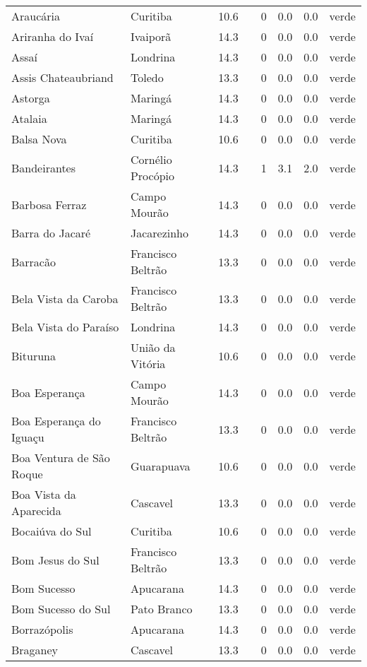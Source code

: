 \begin{longtable}{l|lllllll}
  Araucária & Curitiba & 10.6 &  & 0 & 0.0 & 0.0 & verde \\ 
  Ariranha do Ivaí & Ivaiporã & 14.3 &  & 0 & 0.0 & 0.0 & verde \\ 
  Assaí & Londrina & 14.3 &  & 0 & 0.0 & 0.0 & verde \\ 
  Assis Chateaubriand & Toledo & 13.3 &  & 0 & 0.0 & 0.0 & verde \\ 
  Astorga & Maringá & 14.3 &  & 0 & 0.0 & 0.0 & verde \\ 
  Atalaia & Maringá & 14.3 &  & 0 & 0.0 & 0.0 & verde \\ 
  Balsa Nova & Curitiba & 10.6 &  & 0 & 0.0 & 0.0 & verde \\ 
  Bandeirantes & Cornélio Procópio & 14.3 &  & 1 & 3.1 & 2.0 & verde \\ 
  Barbosa Ferraz & Campo Mourão & 14.3 &  & 0 & 0.0 & 0.0 & verde \\ 
  Barra do Jacaré & Jacarezinho & 14.3 &  & 0 & 0.0 & 0.0 & verde \\ 
  Barracão & Francisco Beltrão & 13.3 &  & 0 & 0.0 & 0.0 & verde \\ 
  Bela Vista da Caroba & Francisco Beltrão & 13.3 &  & 0 & 0.0 & 0.0 & verde \\ 
  Bela Vista do Paraíso & Londrina & 14.3 &  & 0 & 0.0 & 0.0 & verde \\ 
  Bituruna & União da Vitória & 10.6 &  & 0 & 0.0 & 0.0 & verde \\ 
  Boa Esperança & Campo Mourão & 14.3 &  & 0 & 0.0 & 0.0 & verde \\ 
  Boa Esperança do Iguaçu & Francisco Beltrão & 13.3 &  & 0 & 0.0 & 0.0 & verde \\ 
  Boa Ventura de São Roque & Guarapuava & 10.6 &  & 0 & 0.0 & 0.0 & verde \\ 
  Boa Vista da Aparecida & Cascavel & 13.3 &  & 0 & 0.0 & 0.0 & verde \\ 
  Bocaiúva do Sul & Curitiba & 10.6 &  & 0 & 0.0 & 0.0 & verde \\ 
  Bom Jesus do Sul & Francisco Beltrão & 13.3 &  & 0 & 0.0 & 0.0 & verde \\ 
  Bom Sucesso & Apucarana & 14.3 &  & 0 & 0.0 & 0.0 & verde \\ 
  Bom Sucesso do Sul & Pato Branco & 13.3 &  & 0 & 0.0 & 0.0 & verde \\ 
  Borrazópolis & Apucarana & 14.3 &  & 0 & 0.0 & 0.0 & verde \\ 
  Braganey & Cascavel & 13.3 &  & 0 & 0.0 & 0.0 & verde \\ 

\end{longtable}
